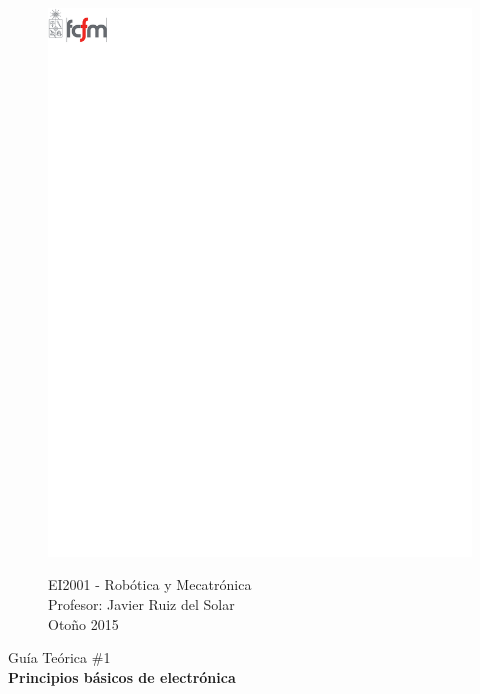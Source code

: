 \documentclass[11pt,letterpaper,notitlepage]{article}
\begin{document}
\begin{figure}
\vspace*{-1.5cm}
\begin{minipage}[c]{0.5\textwidth}
	\includegraphics{../img/fcfm}
\end{minipage} \hfill \begin{minipage}[t]{0.4\textwidth}
\begin{flushright}
	EI2001 - Robótica y Mecatrónica \\
	Profesor: Javier Ruiz del Solar \\
	Otoño 2015
\end{flushright}
\end{minipage}
\noindent\makebox[\linewidth]{\rule{\textwidth}{1pt}}
\end{figure}

\begin{center}
\huge Guía Teórica \#1 \\
\Large \textbf{Principios básicos de electrónica}
\end{center}
\end{document}
